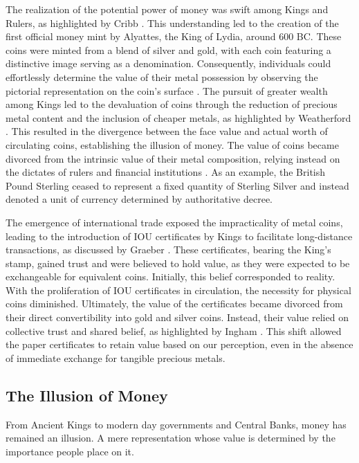 The realization of the potential power of money was swift among Kings and Rulers, as highlighted by Cribb \cite{cribb1991}. This understanding led to the
creation of the first official money mint by Alyattes, the King of Lydia, around 600 BC. These coins were minted from a blend of silver and gold, with
each coin featuring a distinctive image serving as a denomination. Consequently, individuals could effortlessly determine the value of their metal
possession by observing the pictorial representation on the coin's surface \cite{deVries2008}. The pursuit of greater wealth among Kings led to the devaluation of coins through the reduction of precious metal content and the inclusion of cheaper metals, as highlighted by Weatherford \cite{weatherford1997}. This resulted in the divergence between the face value and actual worth of circulating coins, establishing the illusion of money. The value of coins became divorced from the intrinsic value of their metal composition, relying instead on the dictates of rulers and financial institutions \cite{ferguson2009}. As an example, the British Pound Sterling ceased to represent a fixed quantity of Sterling Silver and instead denoted a unit of currency determined by authoritative decree.

The emergence of international trade exposed the impracticality of metal coins, leading to the introduction of IOU certificates by Kings to facilitate
long-distance transactions, as discussed by Graeber \cite{graeber2011}. These certificates, bearing the King's stamp, gained trust and were believed
to hold value, as they were expected to be exchangeable for equivalent coins. Initially, this belief corresponded to reality. With the proliferation of IOU certificates in circulation, the necessity for physical coins diminished. Ultimately, the value of the certificates became divorced from their direct convertibility into gold and silver coins. Instead, their value relied on collective trust and shared belief, as highlighted by Ingham \cite{ingham2004}. This shift allowed the paper certificates to retain value based on our perception, even in the absence of immediate exchange for tangible precious metals.

\subsection{The Illusion of Money}
From Ancient Kings to modern day governments and Central Banks, money has remained an illusion. A mere representation whose value is determined by
the importance people place on it.

